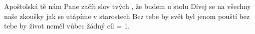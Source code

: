 \begin{TEXT}{Apoštolská}
\SLOKA {} tě  nám Pane  \NL
{} začít  slov tvých   \NL
{}, že  budem  \NL
{} u  stolu     
\SLOKA Dívej se na všechny naše zkoušky \NL
jak se utápíme v starostech \NL
Bez tebe by svět byl jenom pouští \NL
bez tebe by život neměl vůbec žádný cíl 
\SLOKA = 1. \NL
\end{TEXT}
